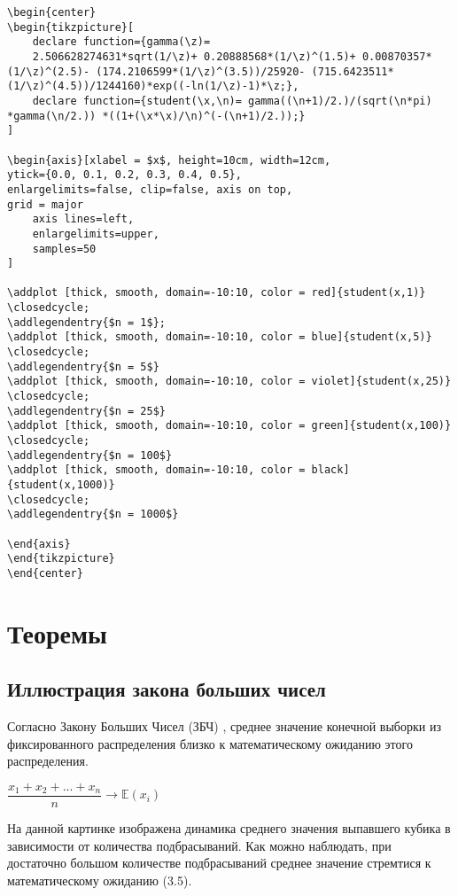 \documentclass[12pt,a4paper]{article}
\begin{document}
\begin{lstlisting}
\begin{center}
\begin{tikzpicture}[
    declare function={gamma(\z)=
    2.506628274631*sqrt(1/\z)+ 0.20888568*(1/\z)^(1.5)+ 0.00870357*(1/\z)^(2.5)- (174.2106599*(1/\z)^(3.5))/25920- (715.6423511*(1/\z)^(4.5))/1244160)*exp((-ln(1/\z)-1)*\z;},
    declare function={student(\x,\n)= gamma((\n+1)/2.)/(sqrt(\n*pi) *gamma(\n/2.)) *((1+(\x*\x)/\n)^(-(\n+1)/2.));}
]

\begin{axis}[xlabel = $x$, height=10cm, width=12cm,
ytick={0.0, 0.1, 0.2, 0.3, 0.4, 0.5},
enlargelimits=false, clip=false, axis on top,
grid = major
    axis lines=left,
    enlargelimits=upper,
    samples=50
]

\addplot [thick, smooth, domain=-10:10, color = red]{student(x,1)} \closedcycle;
\addlegendentry{$n = 1$};
\addplot [thick, smooth, domain=-10:10, color = blue]{student(x,5)} \closedcycle;
\addlegendentry{$n = 5$}
\addplot [thick, smooth, domain=-10:10, color = violet]{student(x,25)}
\closedcycle;
\addlegendentry{$n = 25$}
\addplot [thick, smooth, domain=-10:10, color = green]{student(x,100)}
\closedcycle;
\addlegendentry{$n = 100$}
\addplot [thick, smooth, domain=-10:10, color = black]{student(x,1000)}
\closedcycle;
\addlegendentry{$n = 1000$}

\end{axis}
\end{tikzpicture}
\end{center}
\end{lstlisting}

\clearpage

\section{Теоремы}
\subsection{Иллюстрация закона больших чисел}

Согласно Закону Больших Чисел (ЗБЧ) , среднее значение конечной выборки из фиксированного распределения близко к математическому ожиданию этого распределения.

\begin{center}
	$ \dfrac{x_1 + x_2 + ... + x_n}{n} \to \mathbb{E}(x_i) $
\end{center}

На данной картинке изображена динамика среднего значения  выпавшего кубика в зависимости от количества подбрасываний. Как можно наблюдать, при достаточно большом количестве подбрасываний среднее значение стремтися к математическому ожиданию (3.5).
\end{document}
